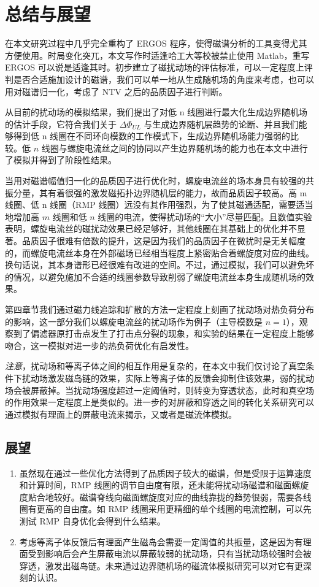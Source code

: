 \chapter{总结与展望}

在本文研究过程中几乎完全重构了 ERGOS 程序，使得磁谱分析的工具变得尤其方便使用。时局变化突兀，本文写作时适逢哈工大等校被禁止使用 Matlab，重写 ERGOS 可以说是适逢其时。初步建立了磁扰动场的评估标准，可以一定程度上评判是否合适施加设计的磁谱，我们可以单一地从生成随机场的角度来考虑，也可以用对磁谱归一化，考虑了 NTV 之后的品质因子进行判断。

从目前的扰动场的模拟结果，我们提出了对低 n 线圈进行最大化生成边界随机场的估计手段，它符合我们关于 $\Delta\Phi_{UL}$ 与生成边界随机层趋势的论断、并且我们能够得到低 n 线圈在不同环向模数的工作模式下，生成边界随机场能力强弱的比较。低 $n$ 线圈与螺旋电流丝之间的协同以产生边界随机场的能力也在本文中进行了模拟并得到了阶段性结果。

当用对磁谱幅值归一化的品质因子进行优化时，螺旋电流丝的场本身具有较强的共振分量，其有着很强的激发磁拓扑边界随机层的能力，故而品质因子较高。高 m 线圈、低 n 线圈（RMP 线圈）远没有其作用强烈，为了使其磁通适配，需要适当地增加高 $m$ 线圈和低 $n$ 线圈的电流，使得扰动场的“大小”尽量匹配。且数值实验表明，螺旋电流丝的磁扰动效果已经足够好，其他线圈在其基础上的优化并不显著。品质因子很难有倍数的提升，这是因为我们的品质因子在微扰时是无关幅度的，而螺旋电流丝本身在外部磁场已经相当程度上紧密贴合着螺旋度对应的曲线。换句话说，其本身谱形已经很难有改进的空间。不过，通过模拟，我们可以避免坏的情况，以避免施加不合适的线圈参数导致削弱了螺旋电流丝本身生成随机场的效果。

第四章节我们通过磁力线追踪和扩散的方法一定程度上刻画了扰动场对热负荷分布的影响，这一部分我们以螺旋电流丝的扰动场作为例子（主导模数是 $n=1$），观察到了偏滤器原打击点发生了打击点分裂的现象，和实验的结果在一定程度上能够吻合，这一模拟对进一步的热负荷优化有启发性。

\textit{注意}，扰动场和等离子体之间的相互作用是复杂的，在本文中我们仅讨论了真空条件下扰动场激发磁岛链的效果，实际上等离子体的反馈会抑制住该效果，弱的扰动场会被屏蔽掉。当扰动场强度超过一定阈值时，则转变为穿透状态，此时和真空场的作用效果一定程度上是类似的。进一步的对屏蔽和穿透之间的转化关系研究可以通过模拟有理面上的屏蔽电流来揭示，又或者是磁流体模拟。

\section{展望}
\begin{enumerate}
    \item 虽然现在通过一些优化方法得到了品质因子较大的磁谱，但是受限于运算速度和计算时间，RMP 线圈的调节自由度有限，还未能将扰动场磁谱和磁面螺旋度贴合地较好。磁谱脊线向磁面螺旋度对应的曲线靠拢的趋势很弱，需要各线圈有更高的自由度。如 RMP 线圈采用更精细的单个线圈的电流控制，可以先测试 RMP 自身优化会得到什么结果。
    \item 考虑等离子体反馈后有理面产生磁岛会需要一定阈值的共振量，这是因为有理面受到影响后会产生屏蔽电流以屏蔽较弱的扰动场，只有当扰动场较强时会被穿透，激发出磁岛链。未来通过边界随机场的磁流体模拟研究可以对它有更深刻的认识。
\end{enumerate}



